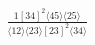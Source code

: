 \documentclass[varwidth, border=5pt]{standalone}
\begin{document}
\begin{my}
$\begin{gathered}
\scriptscriptstyle\frac{1[34]^2⟨45⟩⟨25⟩}{⟨12⟩⟨23⟩[23]^2⟨34⟩}
\end{gathered}$
\end{my}
\end{document}
